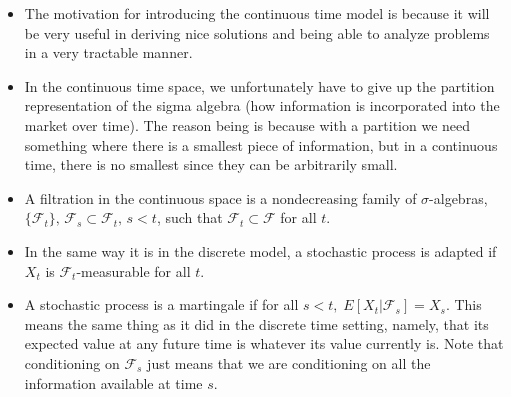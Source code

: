 \documentclass[11pt]{article}
\begin{document}
\begin{itemize}
    \item The motivation for introducing the continuous time model is because it will be very 
    useful in deriving nice solutions and being able to analyze problems in a very tractable 
    manner. 
    \item In the continuous time space, we unfortunately have to give up the partition 
    representation of the sigma algebra (how information is incorporated into the market over 
    time). The reason being is because with a partition we need something where there is a 
    smallest piece of information, but in a continuous time, there is no smallest since they
    can be arbitrarily small. 
    \item A filtration in the continuous space is a nondecreasing family of $\sigma$-algebras,
    $\{\mathcal{F}_t\}, \, \mathcal{F}_s \subset \mathcal{F}_t, \, s < t$, such that 
    $\mathcal{F}_t \subset \mathcal{F}$ for all $t$.
    \item In the same way it is in the discrete model, a stochastic process is adapted if 
    $X_t$ is $\mathcal{F}_t$-measurable for all $t$.
    \item A stochastic process is a martingale if for all $s<t, \; E[X_t|\mathcal{F}_s]=X_s$.
    This means the same thing as it did in the discrete time setting, namely, that its 
    expected value at any future time is whatever its value currently is.  Note that 
    conditioning on $\mathcal{F}_s$ just means that we are conditioning on all the information 
    available at time $s$.
\end{itemize}
\end{document}
